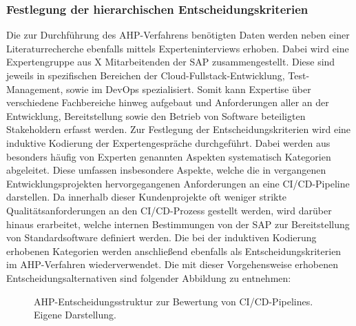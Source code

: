 \subsubsection{Festlegung der hierarchischen Entscheidungskriterien}
 Die zur Durchführung des AHP-Verfahrens benötigten Daten werden neben einer Literaturrecherche ebenfalls mittels Experteninterviews erhoben. Dabei wird eine Expertengruppe aus X Mitarbeitenden der SAP zusammengestellt. Diese sind jeweils in spezifischen Bereichen der Cloud-Fullstack-Entwicklung, Test-Management, sowie im DevOps spezialisiert. Somit kann Expertise über verschiedene Fachbereiche hinweg aufgebaut und Anforderungen aller an der Entwicklung, Bereitstellung sowie den Betrieb von Software beteiligten Stakeholdern erfasst werden. Zur Festlegung der Entscheidungskriterien wird eine induktive Kodierung der Expertengespräche durchgeführt. Dabei werden aus besonders häufig von Experten genannten Aspekten systematisch Kategorien abgeleitet. Diese umfassen insbesondere Aspekte, welche die in vergangenen Entwicklungsprojekten hervorgegangenen Anforderungen an eine CI/CD-Pipeline darstellen. Da innerhalb dieser Kundenprojekte oft weniger strikte Qualitätsanforderungen an den CI/CD-Prozess gestellt werden, wird darüber hinaus erarbeitet, welche internen Bestimmungen von der SAP zur Bereitstellung von Standardsoftware definiert werden. Die bei der induktiven Kodierung erhobenen Kategorien werden anschließend ebenfalls als Entscheidungskriterien im AHP-Verfahren wiederverwendet. Die mit dieser Vorgehensweise erhobenen Entscheidungsalternativen sind folgender Abbildung zu entnehmen:
 \begin{center}
	\begin{figure}[H]
		\centering
		\caption[AHP-Entscheidungsstruktur zur Bewertung von CI/CD-Pipelines]{AHP-Entscheidungsstruktur zur Bewertung von CI/CD-Pipelines. Eigene Darstellung.}
		\label{fig:AHP_E}
	\end{figure}
\end{center}
\vspace*{-10mm}
